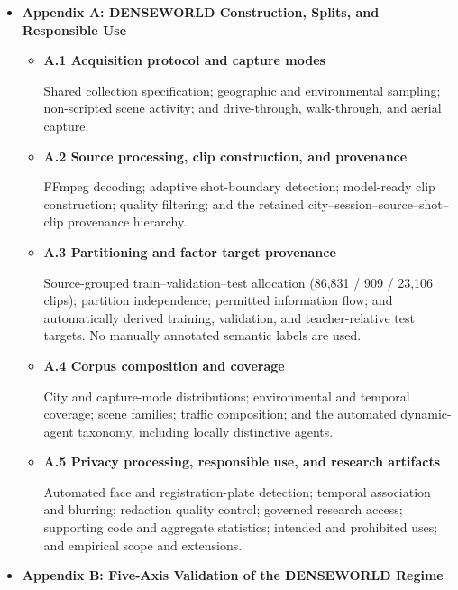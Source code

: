 \begin{itemize}

\item \textbf{Appendix A: DENSEWORLD Construction, Splits, and Responsible Use}
\begin{itemize}

    \item \textbf{A.1 Acquisition protocol and capture modes}
    
    Shared collection specification; geographic and environmental
    sampling; non-scripted scene activity; and drive-through,
    walk-through, and aerial capture.

    \item \textbf{A.2 Source processing, clip construction, and provenance}
    
    FFmpeg decoding; adaptive shot-boundary detection; model-ready clip
    construction; quality filtering; and the retained
    city--session--source--shot--clip provenance hierarchy.

    \item \textbf{A.3 Partitioning and factor target provenance}
    
    Source-grouped train--validation--test allocation (86,831 / 909 / 23,106 clips);
    partition independence; permitted information flow; and
    automatically derived training, validation, and teacher-relative test
    targets. No manually annotated semantic labels are used.

    \item \textbf{A.4 Corpus composition and coverage}
    
    City and capture-mode distributions; environmental and temporal
    coverage; scene families; traffic composition; and the automated
    dynamic-agent taxonomy, including locally distinctive agents.

    \item \textbf{A.5 Privacy processing, responsible use, and research artifacts}
    
    Automated face and registration-plate detection; temporal
    association and blurring; redaction quality control; governed
    research access; supporting code and aggregate statistics;
    intended and prohibited uses; and empirical scope and extensions.

\end{itemize}

\item \textbf{Appendix B: Five-Axis Validation of the DENSEWORLD Regime}
\begin{itemize}


\end{itemize}
\end{itemize}
